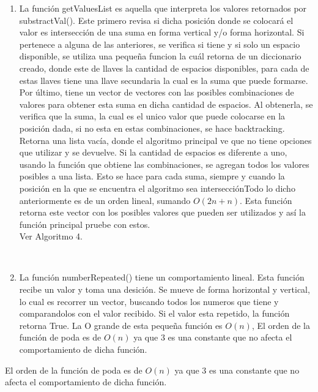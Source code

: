 \documentclass[conference]{IEEEtran}
\begin{document}
\begin{enumerate}[I]
\item La funci\'on getValuesList es aquella que interpreta los valores retornados por substractVal(). Este primero revisa si dicha posici\'on donde se colocar\'a el valor es intersecci\'on de una suma en forma vertical y/o forma horizontal. Si pertenece a alguna de las anteriores, se verifica si tiene y si solo un espacio disponible, se utiliza una pequeña funcion la cu\'al retorna de un diccionario creado, donde este de llaves la cantidad de espacios disponibles, para cada de estas llaves tiene una llave secundaria la cual es la suma que puede formarse. Por \'ultimo, tiene un vector de vectores con las posibles combinaciones de valores para obtener esta suma en dicha cantidad de espacios.  Al obtenerla, se verifica que la suma, la cual es el unico valor que puede colocarse en la posici\'on dada, si no esta en estas combinaciones, se hace backtracking. Retorna una lista vac\'ia, donde el algoritmo principal ve que no tiene opciones que utilizar y se devuelve. Si la cantidad de espacios es diferente a uno, usando la funci\'on que obtiene las combinaciones, se agregan todos los valores posibles a una lista. Esto se hace para cada suma, siempre y cuando la posici\'on en la que se encuentra el algoritmo sea intersecci\'onTodo lo dicho anteriormente es de un orden lineal, sumando $O(2n + n)$. Esta funci\'on retorna este vector con los posibles valores que pueden ser utilizados y as\'i la funci\'on principal pruebe con estos.\\
Ver Algoritmo 4.

\\

\item  La funci\'on numberRepeated() tiene un comportamiento lineal. Esta funci\'on recibe un valor y toma una desici\'on. Se mueve de forma horizontal y vertical, lo cual es recorrer un vector, buscando todos los numeros que tiene y comparandolos con el valor recibido. Si el valor esta repetido, la funci\'on retorna True. La O grande de esta pequeña funci\'on es $O(n)$,
El orden de la funci\'on de poda es de $O(n)$ ya que $3$ es una constante que no afecta el comportamiento de dicha funci\'on.\\



\end{enumerate}
El orden de la funci\'on de poda es de $O(n)$ ya que $3$ es una constante que no afecta el comportamiento de dicha funci\'on.


\newline
\end{document}
